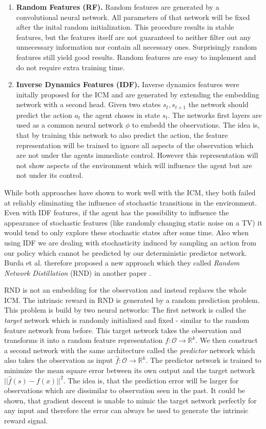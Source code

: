 \begin{enumerate}
  \item \textbf{Random Features (RF).} Random features are generated by a convolutional neural network. All parameters of that network will be fixed after the inital random initialization. This procedure results in stable features, but the features itself are not guaranteed to neither filter out any unnecessary information nor contain all necessary ones. Surprisingly random features still yield good results. Random features are easy to implement and do not require extra training time.
  \item \textbf{Inverse Dynamics Features (IDF).} Inverse dynamics features were initally proposed for the ICM and are generated by extending the embedding network with a second head. Given two states $s_t, s_{t+1}$ the network should predict the action $a_t$ the agent choses in state $s_t$. The networks first layers are used as a common neural network $\phi$ to embedd the observations. The idea is, that by training this network to also predict the action, the feature representation will be trained to ignore all aspects of the observation which are not under the agents immediate control. However this representation will not show aspects of the environment which will influence the agent but are not under its control.
\end{enumerate}

While both approaches have shown to work well with the ICM, they both failed at reliably eliminating the influence of stochastic transitions in the environment. Even with IDF features, if the agent has the possibility to influence the appearance of stochastic features (like randomly changing static noise on a TV) it would tend to only explore these stochastic states after some time. Also when using IDF we are dealing with stochasticity induced by sampling an action from our policy which cannot be predicted by our deterministic predictor network. Burda et al. therefore proposed a new approach which they called \textit{Random Network Distillation} (RND) in another paper \cite{burda2018exploration}.

RND is not an embedding for the observation and instead replaces the whole ICM. The intrinsic reward in RND is generated by a random prediction problem. This problem is build by two neural networks: The first network is called the \textit{target} network which is randomly initialized and fixed - similar to the random feature network from before. This target network takes the observation and transforms it into a random feature representation $f : \mathcal{O} \rightarrow \mathbb{R}^k$. We then construct a second network with the same architecture called the \textit{predictor} network which also takes the observation as input $\hat{f} : \mathcal{O} \rightarrow \mathbb{R}^k$. The predictor network is trained to minimize the mean square error between its own output and the target network $||\hat{f}(s) - f(x)||^2$. The idea is, that the prediction error will be larger for observations which are dissimilar to observation seen in the past. It could be shown, that gradient descent is unable to mimic the target network perfectly for any input and therefore the error can always be used to generate the intrinsic reward signal. 

